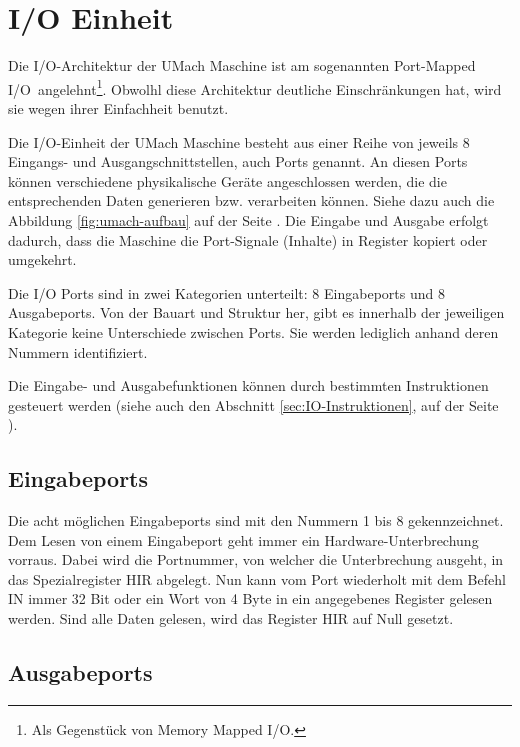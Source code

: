 \section{I/O Einheit}
\label{sec:IO-Einheit}

Die I/O-Architektur der UMach Maschine ist am sogenannten \glqq Port-Mapped
I/O\grqq\ angelehnt\footnote{Als Gegenstück von \glqq Memory Mapped I/O\grqq.}.
Obwolhl diese Architektur deutliche Einschränkungen hat, wird sie wegen ihrer
Einfachheit benutzt.


Die I/O-Einheit der UMach Maschine besteht aus einer Reihe von jeweils 8
Eingangs- und Ausgangschnittstellen, auch Ports
genannt. An diesen Ports können verschiedene physikalische Geräte angeschlossen
werden, die die entsprechenden Daten generieren bzw. verarbeiten können. Siehe
dazu auch die Abbildung \ref{fig:umach-aufbau} auf der Seite
\pageref{fig:umach-aufbau}. Die Eingabe und Ausgabe erfolgt dadurch, dass die
Maschine die Port-Signale (Inhalte) in Register kopiert oder umgekehrt.


Die I/O Ports sind in zwei Kategorien unterteilt: 8 Eingabeports und 8
Ausgabeports. Von der Bauart und Struktur her, gibt es innerhalb der jeweiligen
Kategorie keine Unterschiede zwischen Ports. Sie werden lediglich anhand deren
Nummern identifiziert.


Die Eingabe- und Ausgabefunktionen können durch bestimmten Instruktionen
gesteuert werden (siehe auch den Abschnitt \ref{sec:IO-Instruktionen}, auf der
Seite \pageref{sec:IO-Instruktionen}).



\subsection{Eingabeports}

Die acht möglichen Eingabeports sind mit den Nummern 1 bis 8 gekennzeichnet.
Dem Lesen von einem Eingabeport geht immer ein Hardware-Unterbrechung vorraus.
Dabei wird die Portnummer, von welcher die Unterbrechung ausgeht, in das
Spezialregister HIR abgelegt. Nun kann vom Port wiederholt mit dem Befehl IN immer
32 Bit oder ein Wort von 4 Byte in ein angegebenes Register gelesen werden.
Sind alle Daten gelesen, wird das Register HIR auf Null gesetzt.

\subsection{Ausgabeports}
\label{subsec:Ausgabeports}

